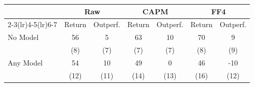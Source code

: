 \begin{tabular}{lcccccc}
   \toprule
   & \multicolumn{2}{c}{Raw} & \multicolumn{2}{c}{CAPM} & \multicolumn{2}{c}{FF4} \\
   \cmidrule(lr){2-3}\cmidrule(lr){4-5}\cmidrule(lr){6-7}
   & Return & Outperf. & Return & Outperf. & Return & Outperf. \\
   \midrule
   No Model & 56 & 5 & 63 & 10 & 70 & 9 \\
   & (8) & (7) & (7) & (7) & (8) & (9) \\
   Any Model & 54 & 10 & 49 & 0 & 46 & -10 \\
   & (12) & (11) & (14) & (13) & (16) & (12) \\
   \bottomrule
\end{tabular}
